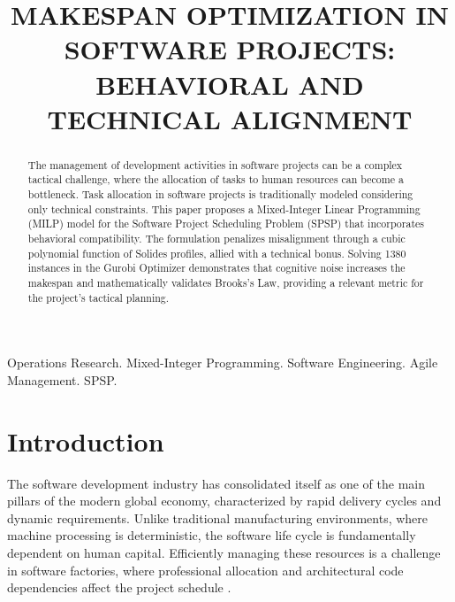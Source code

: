 \documentclass[a4paper,11pt]{article}
\begin{document}
\title{MAKESPAN OPTIMIZATION IN SOFTWARE PROJECTS: \\ 
BEHAVIORAL AND TECHNICAL ALIGNMENT} 

\maketitle
\thispagestyle{fancy}

\author{
}

\author{
}

\vspace{8mm}

\begin{abstract}
The management of development activities in software projects can be a complex
tactical challenge, where the allocation of tasks to human resources can become
a bottleneck. Task allocation in software projects is traditionally modeled
considering only technical constraints. This paper proposes a Mixed-Integer
Linear Programming (MILP) model for the Software Project Scheduling Problem (SPSP)
that incorporates behavioral compatibility. The formulation penalizes misalignment
through a cubic polynomial function of Solides profiles, allied with a technical
bonus. Solving 1380 instances in the Gurobi Optimizer demonstrates that cognitive
noise increases the makespan and mathematically validates Brooks's Law, providing
a relevant metric for the project's tactical planning.
\end{abstract}

\bigskip
\begin{keywords}
Operations Research. Mixed-Integer Programming. Software Engineering. 
Agile Management. SPSP.

\bigskip
{}
\end{keywords}
 
\newpage
\section{Introduction} 
 
The software development industry has consolidated itself as one of the main 
pillars of the modern global economy, characterized by rapid delivery cycles 
and dynamic requirements. Unlike traditional manufacturing environments, 
where machine processing is deterministic, the software life cycle is 
fundamentally dependent on human capital. Efficiently managing these resources 
is a challenge in software factories, where professional allocation and 
architectural code dependencies affect the project schedule \citep{dikert2016, faria2022}.
\end{document}
